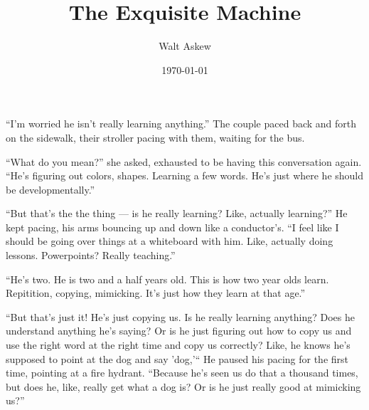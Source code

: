 \documentclass[12pt, oneside]{memoir}
\title{The Exquisite Machine}
\author{Walt Askew}
\date{\today}
\begin{document}
\maketitle

``I'm worried he isn't really learning anything.''
The couple paced back and forth on the sidewalk,
their stroller pacing with them, waiting for the bus.

``What do you mean?'' she asked, exhausted to be having this conversation
again.
``He's figuring out colors, shapes.
Learning a few words.
He's just where he should be developmentally.''

``But that's the the thing --- is he really learning?
Like, actually learning?''
He kept pacing, his arms bouncing up and down like a conductor's.
``I feel like I should be going over things at a whiteboard with him.
Like, actually doing lessons.
Powerpoints?
Really teaching.''

``He's two.
He is two and a half years old.
This is how two year olds learn.
Repitition, copying, mimicking.
It's just how they learn at that age.''

``But that's just it!
He's just copying us.
Is he really learning anything?
Does he understand anything he's saying?
Or is he just figuring out how to copy us and use the right word at
the right time and copy us correctly?
Like, he knows he's supposed to point at the dog and say 'dog,'``
He paused his pacing for the first time, pointing at a fire hydrant.
``Because he's seen us do that a thousand times, but does he, like, really get
what a dog is?
Or is he just really good at mimicking us?''
\end{document}
